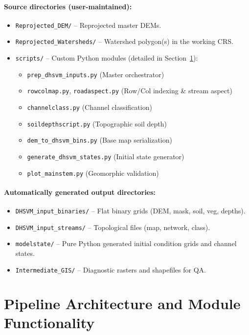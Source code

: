 \documentclass[11pt]{article}
\begin{document}
\paragraph{Source directories (user-maintained):}
\begin{itemize}
  \item \texttt{Reprojected\_DEM/} -- Reprojected master DEMs.
  \item \texttt{Reprojected\_Watersheds/} -- Watershed polygon(s) in the working CRS.
  \item \texttt{scripts/} -- Custom Python modules (detailed in Section~\ref{sec:modules}):
        \begin{itemize}
          \item \texttt{prep\_dhsvm\_inputs.py} (Master orchestrator)
          \item \texttt{rowcolmap.py}, \texttt{roadaspect.py} (Row/Col indexing \& stream aspect)
          \item \texttt{channelclass.py} (Channel classification)
          \item \texttt{soildepthscript.py} (Topographic soil depth)
          \item \texttt{dem\_to\_dhsvm\_bins.py} (Base map serialization)
          \item \texttt{generate\_dhsvm\_states.py} (Initial state generator)
          \item \texttt{plot\_mainstem.py} (Geomorphic validation)
        \end{itemize}
\end{itemize}

\paragraph{Automatically generated output directories:}
\begin{itemize}
  \item \texttt{DHSVM\_input\_binaries/} -- Flat binary grids (DEM, mask, soil, veg, depths).
  \item \texttt{DHSVM\_input\_streams/} -- Topological files (map, network, class).
  \item \texttt{modelstate/} -- Pure Python generated initial condition grids and channel states.
  \item \texttt{Intermediate\_GIS/} -- Diagnostic rasters and shapefiles for QA.
\end{itemize}

\section{Pipeline Architecture and Module Functionality}
\label{sec:modules}
\end{document}
